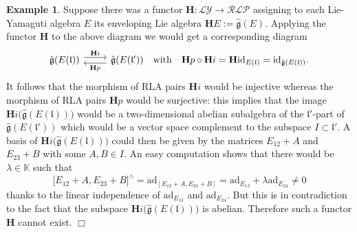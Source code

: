 \documentclass [11pt] {article}
\theoremstyle{definition}
\newtheorem{example}[lemma]{Example}
\begin{document}
\begin{example}
Suppose there was a functor $\mathbf{H}:\mathcal{LY}\to \mathcal{RLP}$ assigning to each Lie-Yamaguti algebra $E$ its enveloping Lie algebra 
$\mathbf{H}E:=\hat{\mathfrak{g}}(E)$. Applying the functor $\mathbf{H}$ to the above diagram we would get
a corresponding diagram
\[
\begin{tikzcd}
	\hat{\mathfrak{g}}(E(\mathfrak{l}))
	\arrow[r, yshift=0.7ex, "\mathbf{H}i"] 
	& \hat{\mathfrak{g}}(E(\mathfrak{l}'))
	\arrow[l, yshift=-0.7ex, "\mathbf{H}p"] 
	~~~\mathrm{with}~~~ \mathbf{H}p\circ \mathbf{H}i
	=\mathbf{H}\mathrm{id}_{E(\mathfrak{l})}=
	\mathrm{id}_{\hat{\mathfrak{g}}(E(\mathfrak{l}))}.
\end{tikzcd}
\]
It follows that the morphism of RLA pairs $\mathbf{H}i$ would be injective whereas the morphism of RLA pairs $\mathbf{H}p$ would be surjective: this implies that
the image $\mathbf{H}i\big(\hat{\mathfrak{g}}(E(\mathfrak{l}))\big)$ would be a
two-dimensional abelian subalgebra of the $\mathfrak{l}'$-part of
$\hat{\mathfrak{g}}(E(\mathfrak{l}'))$ which would be a vector space complement 
to the subspace $I\subset \mathfrak{l}'$. A basis of 
$\mathbf{H}i\big(\hat{\mathfrak{g}}(E(\mathfrak{l}))\big)$
could then be given by the matrices $E_{12}+A$ and $E_{23}+B$ with
some $A,B\in I$. An easy computation shows that there would be $\lambda\in\mathbb{K}$ such that
\[
   \big[E_{12}+A,E_{23}+B\big]^\wedge=
   \mathrm{ad}_{[E_{12}+A,E_{23}+B]}=\mathrm{ad}_{E_{13}}+\lambda \mathrm{ad}_{E_{24}}\not =0
\]
thanks to the linear independence of $\mathrm{ad}_{E_{13}}$ and
$\mathrm{ad}_{E_{24}}$. But this is in contradiction to the fact that
the subspace $\mathbf{H}i\big(\hat{\mathfrak{g}}(E(\mathfrak{l}))\big)$
is abelian. Therefore such a functor $\mathbf{H}$ cannot exist.
\hfill $\Box$ 
\end{example}
\end{document}
